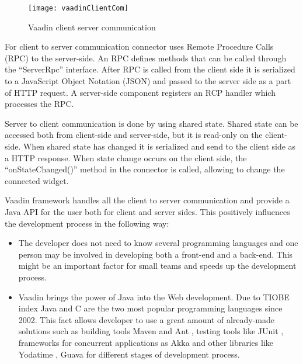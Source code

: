 	  \begin{figure}
      	\texttt{[image: vaadinClientCom]}
      	\caption{Vaadin client server communication}
      	\label{fig:vaadinClientCom}
      \end{figure}
      
   For client to server communication connector uses Remote Procedure
   Calls (RPC) to the server-side. An RPC defines methods that can be called
   through the ``ServerRpc'' interface. After RPC is called from the client side
   it is serialized to a JavaScript Object Notation (JSON) and passed to the
   server side as a part of HTTP request. A server-side component registers an
   RCP handler which processes the RPC. 
   
   Server to client communication is done by using shared
   state. Shared state can be accessed both from client-side and server-side,
   but it is read-only on the client-side. When shared state has changed it is
   serialized and send to the client side as a HTTP response. When state change
   occurs on the client side, the ``onStateChanged()'' method in the connector is called,
   allowing to change the connected widget.
   
   
  
   Vaadin framework handles all the client to server communication and provide
   a Java API for the user both for client and server sides. This positively
    influences the development process in the following way:
   \begin{itemize}
     \item The developer does not need to know several programming languages and one
    person may be involved in developing both a front-end and a back-end.
    This might be an important factor for small teams and speeds up the development
    process.
   \item Vaadin brings the power of Java into the Web development. Due to
    TIOBE index \cite{tiobeIndex} Java and C are the two most popular programming
    languages since 2002. This fact allows developer to use a great amount of
    already-made solutions such as building tools Maven \cite{maven} and Ant
    \cite{ant}, testing tools like JUnit \cite{junit}, frameworks for concurrent
    applications as Akka \cite{akka} \cite{akkaUseCases} and other libraries
    like Yodatime \cite{yodatime}, Guava \cite{guava} for different stages of development process.
  \end{itemize}  		
		

